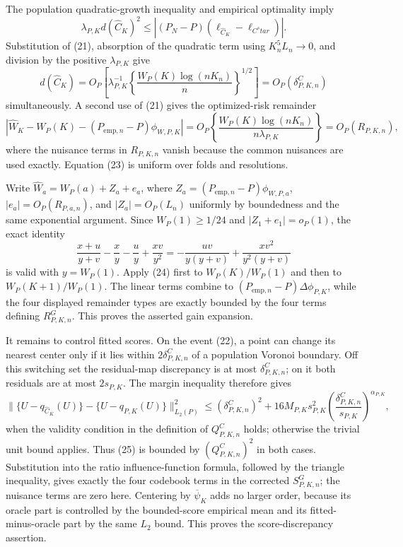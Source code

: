 The population quadratic-growth inequality and empirical optimality imply
\[
 \lambda_{P,K}d(\widehat C_K)^2
 \leq |(P_N-P)(\ell_{\widehat C_K}-\ell_{C^star})|.
\]
Substitution of (21), absorption of the quadratic term using \(K_n^5L_n\to0\), and division by the positive \(\lambda_{P,K}\) give
\[
 d(\widehat C_K)
 =O_P\left[\lambda_{P,K}^{-1}
 \left\{\frac{W_P(K)\log(nK_n)}n\right\}^{1/2}\right]
 =O_P(\delta^C_{P,K,n}) \tag{22}
\]
simultaneously.  A second use of (21) gives the optimized-risk remainder
\[
 \left|\widehat W_K-W_P(K)-(P_{\mathrm{emp},n}-P)\phi_{W,P,K}\right|
 =O_P\left\{\frac{W_P(K)\log(nK_n)}{n\lambda_{P,K}}\right\}
 =O_P(R_{P,K,n}), \tag{23}
\]
where the nuisance terms in \(R_{P,K,n}\) vanish because the common nuisances are used exactly.  Equation (23) is uniform over folds and resolutions.

Write \(\widehat W_a=W_P(a)+Z_a+e_a\), where \(Z_a=(P_{\mathrm{emp},n}-P)\phi_{W,P,a}\), \(|e_a|=O_P(R_{P,a,n})\), and \(|Z_a|=O_P(L_n)\) uniformly by boundedness and the same exponential argument.  Since \(W_P(1)\geq1/24\) and \(|Z_1+e_1|=o_P(1)\), the exact identity
\[
 \frac{x+u}{y+v}-\frac xy-\frac uy+\frac{xv}{y^2}
 =-\frac{uv}{y(y+v)}+\frac{xv^2}{y^2(y+v)} \tag{24}
\]
is valid with \(y=W_P(1)\).  Apply (24) first to \(W_P(K)/W_P(1)\) and then to \(W_P(K+1)/W_P(1)\).  The linear terms combine to \((P_{\mathrm{emp},n}-P)\Delta\phi_{P,K}\), while the four displayed remainder types are exactly bounded by the four terms defining \(R^G_{P,K,n}\).  This proves the asserted gain expansion.

It remains to control fitted scores.  On the event (22), a point can change its nearest center only if it lies within \(2\delta^C_{P,K,n}\) of a population Voronoi boundary.  Off this switching set the residual-map discrepancy is at most \(\delta^C_{P,K,n}\); on it both residuals are at most \(2s_{P,K}\).  The margin inequality therefore gives
\[
 \|\{U-q_{\widehat C_K}(U)\}-\{U-q_{P,K}(U)\}\|_{L_2(P)}^2
 \leq (\delta^C_{P,K,n})^2
 +16M_{P,K}s_{P,K}^2
 \left(\frac{\delta^C_{P,K,n}}{s_{P,K}}\right)^{\alpha_{P,K}}, \tag{25}
\]
when the validity condition in the definition of \(Q^C_{P,K,n}\) holds; otherwise the trivial unit bound applies.  Thus (25) is bounded by \((Q^C_{P,K,n})^2\) in both cases.  Substitution into the ratio influence-function formula, followed by the triangle inequality, gives exactly the four codebook terms in the corrected \(S^G_{P,K,n}\); the nuisance terms are zero here.  Centering by \(\overline\psi_K\) adds no larger order, because its oracle part is controlled by the bounded-score empirical mean and its fitted-minus-oracle part by the same \(L_2\) bound.  This proves the score-discrepancy assertion.

